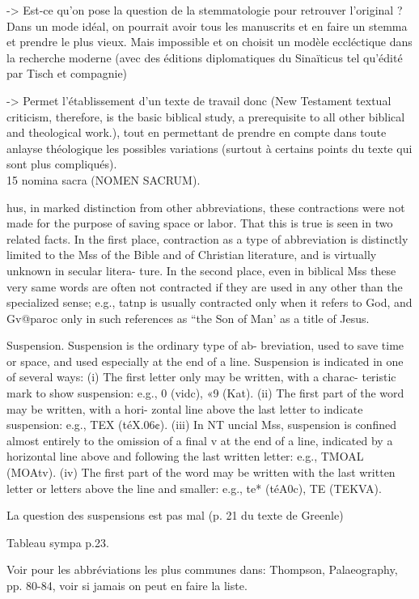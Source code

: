 -> Est-ce qu'on pose la question de la stemmatologie pour retrouver l'original ? Dans un mode idéal, on pourrait avoir tous les manuscrits et en faire un stemma et prendre le plus vieux. Mais impossible et on choisit un modèle eccléctique dans la recherche moderne (avec des éditions diplomatiques du Sinaïticus tel qu'édité par Tisch et compagnie)

-> Permet l'établissement d'un texte de travail donc (New Testament textual criticism, therefore, is
the basic biblical study, a prerequisite to all other biblical and
theological work.), tout en permettant de prendre en compte dans toute anlayse théologique les possibles variations (surtout à certains points du texte qui sont plus compliqués).\\


15 nomina sacra (NOMEN SACRUM).

hus, in marked distinction
from other abbreviations, these contractions were not made for
the purpose of saving space or labor. That this is true is seen in
two related facts. In the first place, contraction as a type of
abbreviation is distinctly limited to the Mss of the Bible and of
Christian literature, and is virtually unknown in secular litera-
ture. In the second place, even in biblical Mss these very same
words are often not contracted if they are used in any other
than the specialized sense; e.g., tatnp is usually contracted only
when it refers to God, and Gv@paroc only in such references as
“the Son of Man’ as a title of Jesus. 

Suspension. Suspension is the ordinary type of ab-
breviation, used to save time or space, and used especially at
the end of a line. Suspension is indicated in one of several
ways:
(i) The first letter only may be written, with a charac-
teristic mark to show suspension: e.g., 0 (vidc), «9 (Kat).
(ii) The first part of the word may be written, with a hori-
zontal line above the last letter to indicate suspension: e.g., TEX
(téX.06¢).
(iii) In NT uncial Mss, suspension is confined almost entirely
to the omission of a final v at the end of a line, indicated by a
horizontal line above and following the last written letter: e.g.,
TMOAL (MOAtv).
(iv) The first part of the word may be written with the last
written letter or letters above the line and smaller: e.g., te*
(téA0c), TE (TEKVA).

La question des suspensions est pas mal (p. 21 du texte de Greenle)

Tableau sympa p.23.

Voir pour les abbréviations les plus communes dans: Thompson, Palaeography, pp.
80-84, voir si jamais on peut en faire la liste.\\

